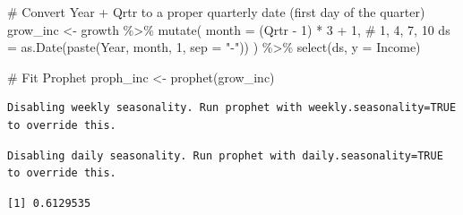 \documentclass[
  letterpaper,
  DIV=11,
  numbers=noendperiod]{scrartcl}
\newenvironment{Shaded}{\begin{snugshade}}{\end{snugshade}}
\newcommand{\AttributeTok}[1]{\textcolor[rgb]{0.40,0.45,0.13}{#1}}
\newcommand{\CommentTok}[1]{\textcolor[rgb]{0.37,0.37,0.37}{#1}}
\newcommand{\DecValTok}[1]{\textcolor[rgb]{0.68,0.00,0.00}{#1}}
\newcommand{\FunctionTok}[1]{\textcolor[rgb]{0.28,0.35,0.67}{#1}}
\newcommand{\NormalTok}[1]{\textcolor[rgb]{0.00,0.23,0.31}{#1}}
\newcommand{\OtherTok}[1]{\textcolor[rgb]{0.00,0.23,0.31}{#1}}
\newcommand{\SpecialCharTok}[1]{\textcolor[rgb]{0.37,0.37,0.37}{#1}}
\newcommand{\StringTok}[1]{\textcolor[rgb]{0.13,0.47,0.30}{#1}}
\begin{document}
\begin{Shaded}
\begin{Highlighting}[]
\CommentTok{\# Convert Year + Qrtr to a proper quarterly date (first day of the quarter)}
\NormalTok{grow\_inc }\OtherTok{\textless{}{-}}\NormalTok{ growth }\SpecialCharTok{\%\textgreater{}\%}
  \FunctionTok{mutate}\NormalTok{(}
    \AttributeTok{month =}\NormalTok{ (Qrtr }\SpecialCharTok{{-}} \DecValTok{1}\NormalTok{) }\SpecialCharTok{*} \DecValTok{3} \SpecialCharTok{+} \DecValTok{1}\NormalTok{,                     }\CommentTok{\# 1, 4, 7, 10}
    \AttributeTok{ds =} \FunctionTok{as.Date}\NormalTok{(}\FunctionTok{paste}\NormalTok{(Year, month, }\DecValTok{1}\NormalTok{, }\AttributeTok{sep =} \StringTok{"{-}"}\NormalTok{))}
\NormalTok{  ) }\SpecialCharTok{\%\textgreater{}\%}
  \FunctionTok{select}\NormalTok{(ds, }\AttributeTok{y =}\NormalTok{ Income)}

\CommentTok{\# Fit Prophet}
\NormalTok{proph\_inc }\OtherTok{\textless{}{-}} \FunctionTok{prophet}\NormalTok{(grow\_inc)}
\end{Highlighting}
\end{Shaded}

\begin{verbatim}
Disabling weekly seasonality. Run prophet with weekly.seasonality=TRUE to override this.
\end{verbatim}

\begin{verbatim}
Disabling daily seasonality. Run prophet with daily.seasonality=TRUE to override this.
\end{verbatim}

\begin{Shaded}
\end{Shaded}

\begin{verbatim}
[1] 0.6129535
\end{verbatim}
\end{document}
